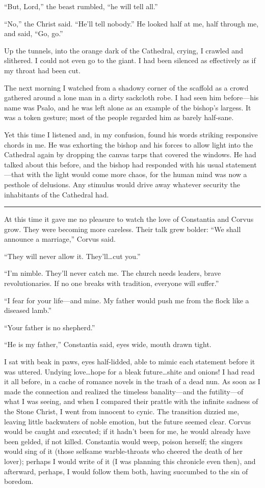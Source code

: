 ``But, Lord,'' the beast rumbled, ``he will tell all.''

``No,'' the Christ said. ``He'll tell nobody.'' He looked half at me, half through me, and said, ``Go, go.''

Up the tunnels, into the orange dark of the Cathedral, crying, I crawled and slithered. I could not even go to the giant. I had been silenced as effectively as if my throat had been cut.

The next morning I watched from a shadowy corner of the scaffold as a crowd gathered around a lone man in a dirty sackcloth robe. I had seen him before—his name was Psalo, and he was left alone as an example of the bishop's largess. It was a token gesture; most of the people regarded him as barely half-sane.

Yet this time I listened and, in my confusion, found his words striking responsive chords in me. He was exhorting the bishop and his forces to allow light into the Cathedral again by dropping the canvas tarps that covered the windows. He had talked about this before, and the bishop had responded with his usual statement—that with the light would come more chaos, for the human mind was now a pesthole of delusions. Any stimulus would drive away whatever security the inhabitants of the Cathedral had.

\fancybreak{* * *}

At this time it gave me no pleasure to watch the love of Constantia and Corvus grow. They were becoming more careless. Their talk grew bolder: ``We shall announce a marriage,'' Corvus said.

``They will never allow it. They'll\ldots cut you.''

``I'm nimble. They'll never catch me. The church needs leaders, brave revolutionaries. If no one breaks with tradition, everyone will suffer.''

``I fear for your life—and mine. My father would push me from the flock like a diseased lamb.''

``Your father is no shepherd.''

``He is my father,'' Constantia said, eyes wide, mouth drawn tight.

I sat with beak in paws, eyes half-lidded, able to mimic each statement before it was uttered. Undying love\ldots hope for a bleak future\ldots shite and onions! I had read it all before, in a cache of romance novels in the trash of a dead nun. As soon as I made the connection and realized the timeless banality—and the futility—of what I was seeing, and when I compared their prattle with the infinite sadness of the Stone Christ, I went from innocent to cynic. The transition dizzied me, leaving little backwaters of noble emotion, but the future seemed clear. Corvus would be caught and executed; if it hadn't been for me, he would already have been gelded, if not killed. Constantia would weep, poison herself; the singers would sing of it (those selfsame warble-throats who cheered the death of her lover); perhaps I would write of it (I was planning this chronicle even then), and afterward, perhaps, I would follow them both, having succumbed to the sin of boredom.

